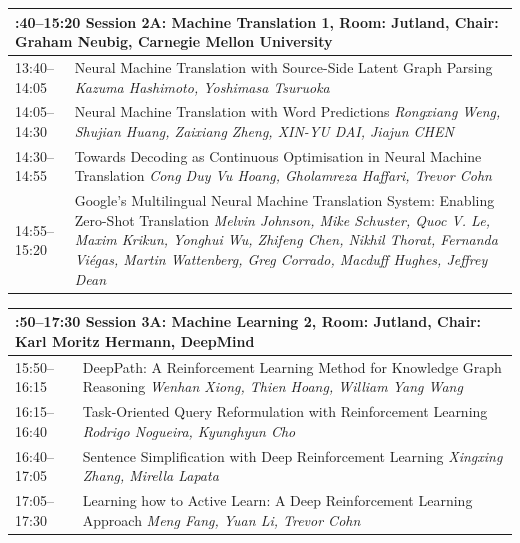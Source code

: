 \documentclass{book}
\renewcommand{\large}{\fontsize{72}{80}\selectfont}
\renewcommand{\large}{\fontsize{82}{90}\selectfont}
\begin{document}
\begin{tabular}{p{20cm}p{70cm}}
  \multicolumn{2}{p{\textwidth}}{\bfseries\large 13:40--15:20 Session 2A: Machine Translation 1, Room:  Jutland, Chair:  Graham Neubig, Carnegie Mellon University} \\\hline

    
    13:40--14:05
    &	Neural Machine Translation with Source-Side Latent Graph Parsing \newline 
    {\itshape Kazuma Hashimoto, Yoshimasa Tsuruoka} \\
    
    14:05--14:30
    &	Neural Machine Translation with Word Predictions \newline 
    {\itshape Rongxiang Weng, Shujian Huang, Zaixiang Zheng, XIN-YU DAI, Jiajun CHEN} \\
    
    14:30--14:55
    &	Towards Decoding as Continuous Optimisation in Neural Machine Translation \newline 
    {\itshape Cong Duy Vu Hoang, Gholamreza Haffari, Trevor Cohn} \\
    
    14:55--15:20
    &	Google's Multilingual Neural Machine Translation System: Enabling Zero-Shot Translation \newline 
    {\itshape Melvin Johnson, Mike Schuster, Quoc V. Le, Maxim Krikun, Yonghui Wu, Zhifeng Chen, Nikhil Thorat, Fernanda Viégas, Martin Wattenberg, Greg Corrado, Macduff Hughes, Jeffrey Dean} \\
    
\end{tabular}
\vspace*{\fill}

\begin{tabular}{p{20cm}p{70cm}}
  \multicolumn{2}{p{\textwidth}}{\bfseries\large 15:50--17:30 Session 3A: Machine Learning 2, Room:  Jutland, Chair:  Karl Moritz Hermann, DeepMind} \\\hline

    
    15:50--16:15
    &	DeepPath: A Reinforcement Learning Method for Knowledge Graph Reasoning \newline 
    {\itshape Wenhan Xiong, Thien Hoang, William Yang Wang} \\
    
    16:15--16:40
    &	Task-Oriented Query Reformulation with Reinforcement Learning \newline 
    {\itshape Rodrigo Nogueira, Kyunghyun Cho} \\
    
    16:40--17:05
    &	Sentence Simplification with Deep Reinforcement Learning \newline 
    {\itshape Xingxing Zhang, Mirella Lapata} \\
    
    17:05--17:30
    &	Learning how to Active Learn: A Deep Reinforcement Learning Approach \newline 
    {\itshape Meng Fang, Yuan Li, Trevor Cohn} \\
    
\end{tabular}
\vspace*{\fill}
\end{document}
